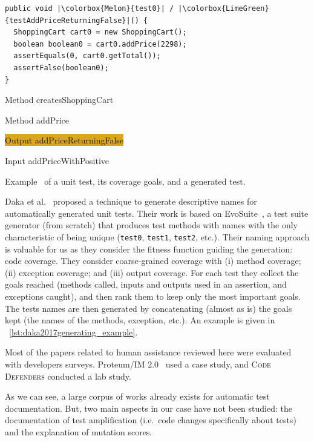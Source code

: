 \documentclass[a4paper,11pt]{sdm_internship}
\theoremstyle{definition}
\begin{document}
\begin{listing}
  \centering
  \begin{verbatim}
public void |\colorbox{Melon}{test0}| / |\colorbox{LimeGreen}{testAddPriceReturningFalse}|() {
  ShoppingCart cart0 = new ShoppingCart();
  boolean boolean0 = cart0.addPrice(2298);
  assertEquals(0, cart0.getTotal());
  assertFalse(boolean0);
}
  \end{verbatim}
  \begin{description}[align=right,labelwidth=5.5cm]
    \item[test0] Method createsShoppingCart
    \item[] Method addPrice
    \item[] \hspace*{-\fboxsep}\colorbox{Goldenrod}{Output addPriceReturningFalse}
    \item[] Input addPriceWithPositive
  \end{description}
  \caption{Example~\cite{daka2017generating} of a unit test, its coverage goals, and a generated test.}%
\label{lst:daka2017generating_example}
\end{listing}
Daka et al.~\cite{daka2017generating} proposed a technique to generate descriptive names for automatically generated unit tests.
Their work is based on EvoSuite~\cite{fraser2011evosuite}, a test suite generator (from scratch) that produces test methods with names with the only characteristic of being unique (\texttt{test0}, \texttt{test1}, \texttt{test2}, etc.).
Their naming approach is valuable for us as they consider the fitness function guiding the generation: code coverage.
They consider coarse-grained coverage with (i) method coverage; (ii) exception coverage; and (iii) output coverage.
For each test they collect the goals reached (methods called, inputs and outputs used in an assertion, and exceptions caught), and then rank them to keep only the most important goals.
The tests names are then generated by concatenating (almost as is) the goals kept (the names of the methods, exception, etc.).
An example is given in \listingname~\ref{lst:daka2017generating_example}.

Most of the papers related to human assistance reviewed here were evaluated with developers surveys.
Proteum/IM 2.0~\cite{delamaro2001proteum} used a case study, and \textsc{Code Defenders} conducted a lab study.

As we can see, a large corpus of works already exists for automatic test documentation.
But, two main aspects in our case have not been studied: the documentation of test amplification (i.e.\ code changes specifically about tests) and the explanation of mutation scores.
\end{document}
